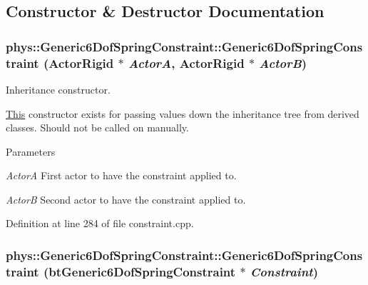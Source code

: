 \subsection{Constructor \& Destructor Documentation}
\hypertarget{classphys_1_1Generic6DofSpringConstraint_a88cf5bfb5db55b957652831c3295b56a}{
\subsubsection[{Generic6DofSpringConstraint}]{\setlength{\rightskip}{0pt plus 5cm}phys::Generic6DofSpringConstraint::Generic6DofSpringConstraint ({\bf ActorRigid} $\ast$ {\em ActorA}, \/  {\bf ActorRigid} $\ast$ {\em ActorB})}}
\label{d1/dc7/classphys_1_1Generic6DofSpringConstraint_a88cf5bfb5db55b957652831c3295b56a}


Inheritance constructor. 

\hyperlink{structThis}{This} constructor exists for passing values down the inheritance tree from derived classes. Should not be called on manually. 
\begin{DoxyParams}{Parameters}
\item[{\em ActorA}]First actor to have the constraint applied to. \item[{\em ActorB}]Second actor to have the constraint applied to. \end{DoxyParams}


Definition at line 284 of file constraint.cpp.

\hypertarget{classphys_1_1Generic6DofSpringConstraint_aecd43f6209799587aacee584d3840491}{
\subsubsection[{Generic6DofSpringConstraint}]{\setlength{\rightskip}{0pt plus 5cm}phys::Generic6DofSpringConstraint::Generic6DofSpringConstraint (btGeneric6DofSpringConstraint $\ast$ {\em Constraint})}}
\label{d1/dc7/classphys_1_1Generic6DofSpringConstraint_aecd43f6209799587aacee584d3840491}


